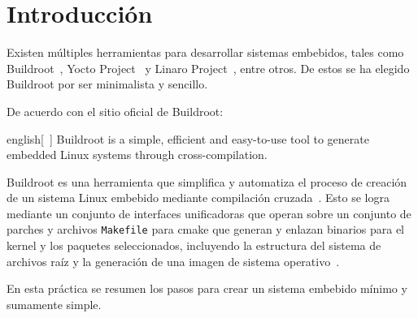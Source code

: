 %
%


\section{Introducción}%
\label{sec:introduction}
Existen múltiples herramientas para desarrollar sistemas embebidos, tales como
	Buildroot~,
	Yocto Project~
	y
	Linaro Project~,
entre otros.
De estos se ha elegido Buildroot por ser minimalista y sencillo.

De acuerdo con el sitio oficial de Buildroot:
\begin{foreigndisplayquote}{english}[~]
	Buildroot is a simple, efficient and easy-to-use tool to generate embedded Linux systems through cross-compilation.
\end{foreigndisplayquote}

Buildroot es una herramienta que simplifica y automatiza el proceso de creación de un sistema Linux embebido mediante compilación cruzada~.
Esto se logra mediante un conjunto de interfaces unificadoras que operan sobre un conjunto de parches y archivos \texttt{Makefile} para cmake que generan y enlazan binarios para el kernel y los paquetes seleccionados, incluyendo la estructura del sistema de archivos raíz y la generación de una imagen de sistema operativo~.

En esta práctica se resumen los pasos para crear un sistema embebido mínimo y sumamente simple.

% 
% 
% 
